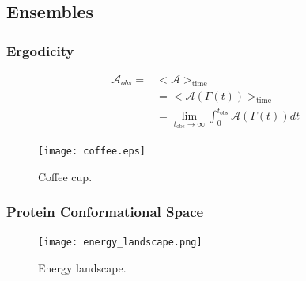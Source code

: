 \documentclass{beamer}
\begin{document}
\subsection{Ensembles} 

\begin{frame}\frametitle{Ergodicity}


\fboxsep=0pt
\noindent %
\begin{minipage}[t]{0.48\linewidth}

\begin{equation}
\begin{aligned}
\mathcal{A}_{obs} =  &  <\mathcal{A}>_{\mathrm{time}} \\
&= <\mathcal{A}(\Gamma (t))>_{\mathrm{time}}  \\
&= \lim_{t_{\mathrm{obs}} \rightarrow \infty } \int_0^{t_{\mathrm{obs}}}
\mathcal{A}(\Gamma (t)) dt
\end{aligned}
\end{equation}


\end{minipage}
\hfill%
\begin{minipage}[t]{0.48\linewidth}
\begin{figure}
\texttt{[image: coffee.eps]}
\caption{{\scriptsize  Coffee cup. }}
\end{figure}

\end{minipage}

\end{frame}

\begin{frame}\frametitle{Protein Conformational Space}

\begin{figure}
\texttt{[image: energy\_landscape.png]}
\caption{{\scriptsize Energy landscape.}}
\end{figure}

\end{frame}
\end{document}

